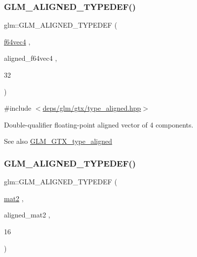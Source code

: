 \subsubsection{\texorpdfstring{G\+L\+M\+\_\+\+A\+L\+I\+G\+N\+E\+D\+\_\+\+T\+Y\+P\+E\+D\+E\+F()}{GLM\_ALIGNED\_TYPEDEF()}\hspace{0.1cm}{\footnotesize\ttfamily [162/209]}}
{\footnotesize\ttfamily glm\+::\+G\+L\+M\+\_\+\+A\+L\+I\+G\+N\+E\+D\+\_\+\+T\+Y\+P\+E\+D\+EF (\begin{DoxyParamCaption}\item[{\hyperlink{group__gtc__type__precision_ga41fb27973aedd37b7284789f2f997420}{f64vec4}}]{,  }\item[{aligned\+\_\+f64vec4}]{,  }\item[{32}]{ }\end{DoxyParamCaption})}



{\ttfamily \#include $<$\hyperlink{gtx_2type__aligned_8hpp}{deps/glm/gtx/type\+\_\+aligned.\+hpp}$>$}

Double-\/qualifier floating-\/point aligned vector of 4 components. \begin{DoxySeeAlso}{See also}
\hyperlink{group__gtx__type__aligned}{G\+L\+M\+\_\+\+G\+T\+X\+\_\+type\+\_\+aligned} 
\end{DoxySeeAlso}
\mbox{\label{group__gtx__type__aligned_gafed7d010235a3aa7ea2f88646858f2ae}} 
\subsubsection{\texorpdfstring{G\+L\+M\+\_\+\+A\+L\+I\+G\+N\+E\+D\+\_\+\+T\+Y\+P\+E\+D\+E\+F()}{GLM\_ALIGNED\_TYPEDEF()}\hspace{0.1cm}{\footnotesize\ttfamily [163/209]}}
{\footnotesize\ttfamily glm\+::\+G\+L\+M\+\_\+\+A\+L\+I\+G\+N\+E\+D\+\_\+\+T\+Y\+P\+E\+D\+EF (\begin{DoxyParamCaption}\item[{\hyperlink{group__core__types_ga8357ec0aab6f8cf69313592492663c3f}{mat2}}]{,  }\item[{aligned\+\_\+mat2}]{,  }\item[{16}]{ }\end{DoxyParamCaption})}



